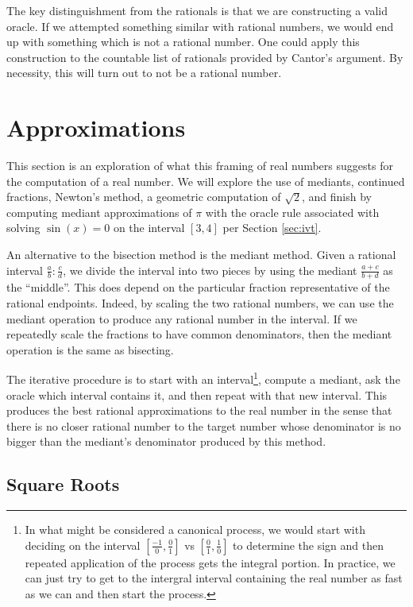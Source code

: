 \documentclass[12pt]{article}
\begin{document}
The key distinguishment from the rationals is that we are constructing a valid oracle. If we attempted something similar with rational numbers, we would end up with something which is not a rational number. One could apply this construction to the countable list of rationals provided by Cantor's argument. By necessity, this will turn out to not be a rational number. 

\section{Approximations}\label{sec:mediant}

This section is an exploration of what this framing of real numbers suggests for the computation of a real number. We will explore the use of mediants, continued fractions, Newton's method, a geometric computation of $\sqrt{2}$, and finish by computing mediant approximations of $\pi$ with the oracle  rule associated with solving $\sin(x)=0$ on the interval $[3,4]$ per Section \ref{sec:ivt}.

An alternative to the bisection method is the mediant method. Given a rational interval $\frac{a}{b} : \frac{c}{d}$, we divide the interval into two pieces by using the mediant $\frac{a+c}{b+d}$ as the ``middle''. This does depend on the particular fraction representative of the rational endpoints. Indeed, by scaling the two rational numbers, we can use the mediant operation to produce any rational number in the interval. If we repeatedly scale the fractions to have common denominators, then the mediant operation is the same as bisecting. 

The iterative procedure is to start with an interval\footnote{In what might be considered a canonical process, we would start with deciding on the interval $[\frac{-1}{0}, \frac{0}{1}]$ vs $[\frac{0}{1}, \frac{1}{0}]$ to determine the sign and then repeated application of the process gets the integral portion. In practice, we can just try to get to the intergral interval containing the real number as fast as we can and then start the process.}, compute a mediant, ask the oracle which interval contains it, and then repeat with that new interval. This produces the best rational approximations to the real number in the sense that there is no closer rational number to the target number whose denominator is no bigger than the mediant's denominator produced by this method. 


\subsection{Square Roots}
\end{document}
